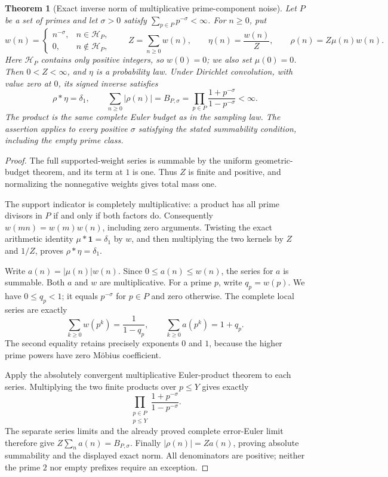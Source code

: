 \documentclass[11pt]{article}
\newtheorem{theorem}{Theorem}[section]
\theoremstyle{definition}
\begin{document}
\begin{theorem}[Exact inverse norm of multiplicative prime-component noise]
\label{thm:component-carrier-exact-inverse-norm}
Let \(P\) be a set of primes and let \(\sigma>0\) satisfy
\(\sum_{p\in P}p^{-\sigma}<\infty\). For \(n\ge0\), put
\[
 w(n)=
 \begin{cases}
 n^{-\sigma},&n\in\mathcal H_P,\\
 0,&n\notin\mathcal H_P,
 \end{cases}
 \qquad Z=\sum_{n\ge0}w(n),\qquad
 \eta(n)=\frac{w(n)}Z,\qquad
 \rho(n)=Z\mu(n)w(n).
\]
Here \(\mathcal H_P\) contains only positive integers, so \(w(0)=0\);
we also set \(\mu(0)=0\). Then \(0<Z<\infty\), and \(\eta\) is
a probability law. Under Dirichlet convolution, with value zero at
\(0\), its signed inverse satisfies
\[
 \rho*\eta=\delta_1,\qquad
 \sum_{n\ge0}|\rho(n)|
   =B_{P,\sigma}
   =\prod_{p\in P}\frac{1+p^{-\sigma}}{1-p^{-\sigma}}<\infty.
\]
The product is the same complete Euler budget as in the sampling
law. The assertion applies to every positive \(\sigma\) satisfying
the stated summability condition, including the empty prime class.
\end{theorem}

\begin{proof}
The full supported-weight series is summable by the uniform
geometric-budget theorem, and its term at \(1\) is one. Thus
\(Z\) is finite and positive, and normalizing the nonnegative
weights gives total mass one.

The support indicator is completely multiplicative: a product
has all prime divisors in \(P\) if and only if both factors do.
Consequently \(w(mn)=w(m)w(n)\), including zero arguments.
Twisting the exact arithmetic identity \(\mu*\boldsymbol1=\delta_1\)
by \(w\), and then multiplying the two kernels by \(Z\) and \(1/Z\),
proves \(\rho*\eta=\delta_1\).

Write \(a(n)=|\mu(n)|w(n)\). Since \(0\le a(n)\le w(n)\),
the series for \(a\) is summable. Both \(a\) and \(w\) are
multiplicative. For a prime \(p\), write \(q_p=w(p)\). We have
\(0\le q_p<1\); it equals \(p^{-\sigma}\) for \(p\in P\)
and zero otherwise. The complete local series are exactly
\[
 \sum_{k\ge0}w(p^k)=\frac1{1-q_p},
 \qquad
 \sum_{k\ge0}a(p^k)=1+q_p.
\]
The second equality retains precisely exponents \(0\) and \(1\),
because the higher prime powers have zero M\"obius coefficient.

Apply the absolutely convergent multiplicative Euler-product
theorem to each series. Multiplying the two finite products over
\(p\le Y\) gives exactly
\[
 \prod_{\substack{p\in P\\p\le Y}}
       \frac{1+p^{-\sigma}}{1-p^{-\sigma}}.
\]
The separate series limits and the already proved complete
error-Euler limit therefore give
\(Z\sum_n a(n)=B_{P,\sigma}\).
Finally \(|\rho(n)|=Za(n)\), proving absolute summability and
the displayed exact norm. All denominators are positive; neither
the prime \(2\) nor empty prefixes require an exception.
\end{proof}
\end{document}
